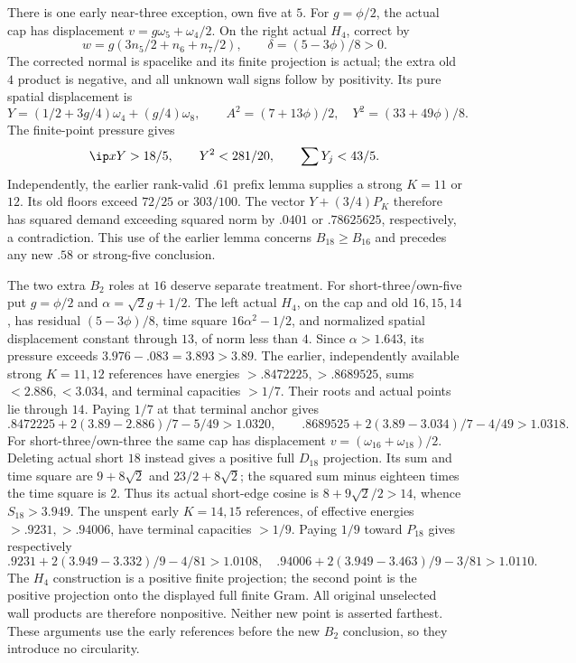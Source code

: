 There is one early near-three exception, own five at \(5\).
For \(g=\phi/2\), the actual cap has displacement
\(v=g\omega_5+\omega_4/2\). On the right actual \(H_4\), correct by
\[
 w=g(3n_5/2+n_6+n_7/2),\qquad
 \delta=(5-3\phi)/8>0.
\]
The corrected normal is spacelike and its finite projection is
actual; the extra old \(4\) product is negative, and all unknown
wall signs follow by positivity. Its pure spatial displacement is
\[
 Y=(1/2+3g/4)\omega_4+(g/4)\omega_8,\qquad
 A^2=(7+13\phi)/2,\quad Y^2=(33+49\phi)/8.
\]
The finite-point pressure gives
\[
 \ip xY>18/5,\qquad Y^2<281/20,\qquad
 \sum Y_j<43/5.
\]
Independently, the earlier rank-valid \(.61\) prefix lemma supplies
a strong \(K=11\) or \(12\). Its old floors exceed \(72/25\)
or \(303/100\). The vector \(Y+(3/4)P_K\) therefore has
squared demand exceeding squared norm by \(.0401\) or
\(.78625625\), respectively, a contradiction.
This use of the earlier lemma concerns \(B_{18}\geq B_{16}\)
and precedes any new \(.58\) or strong-five conclusion.

The two extra \(B_2\) roles at \(16\) deserve separate treatment.
For short-three/own-five put \(g=\phi/2\) and
\(\alpha=\sqrt2g+1/2\). The left actual \(H_4\), on the cap and
old \(16,15,14\), has residual \((5-3\phi)/8\), time square
\(16\alpha^2-1/2\), and normalized spatial displacement constant
through \(13\), of norm less than \(4\). Since \(\alpha>1.643\),
its pressure exceeds \(3.976-.083=3.893>3.89\).
The earlier, independently available strong \(K=11,12\) references
have energies \(>.8472225,>.8689525\), sums \(<2.886,<3.034\),
and terminal capacities \(>1/7\). Their roots and actual points
lie through \(14\). Paying \(1/7\) at that terminal anchor gives
\[
 .8472225+2(3.89-2.886)/7-5/49>1.0320,
 \qquad
 .8689525+2(3.89-3.034)/7-4/49>1.0318.
\]
For short-three/own-three the same cap has displacement
\(v=(\omega_{16}+\omega_{18})/2\). Deleting actual short \(18\)
instead gives a positive full \(D_{18}\) projection. Its sum and
time square are \(9+8\sqrt2\) and \(23/2+8\sqrt2\); the squared
sum minus eighteen times the time square is \(2\). Thus its actual
short-edge cosine is \(8+9\sqrt2/2>14\), whence \(S_{18}>3.949\).
The unspent early \(K=14,15\) references, of effective energies
\(>.9231,>.94006\), have terminal capacities \(>1/9\).
Paying \(1/9\) toward \(P_{18}\) gives respectively
\[
 .9231+2(3.949-3.332)/9-4/81>1.0108,
 \quad .94006+2(3.949-3.463)/9-3/81>1.0110.
\]
The \(H_4\) construction is a positive finite projection; the second
point is the positive projection onto the displayed full finite Gram.
All original unselected wall products are therefore nonpositive.
Neither new point is asserted farthest. These arguments use the
early references before the new \(B_2\) conclusion, so they introduce
no circularity.

